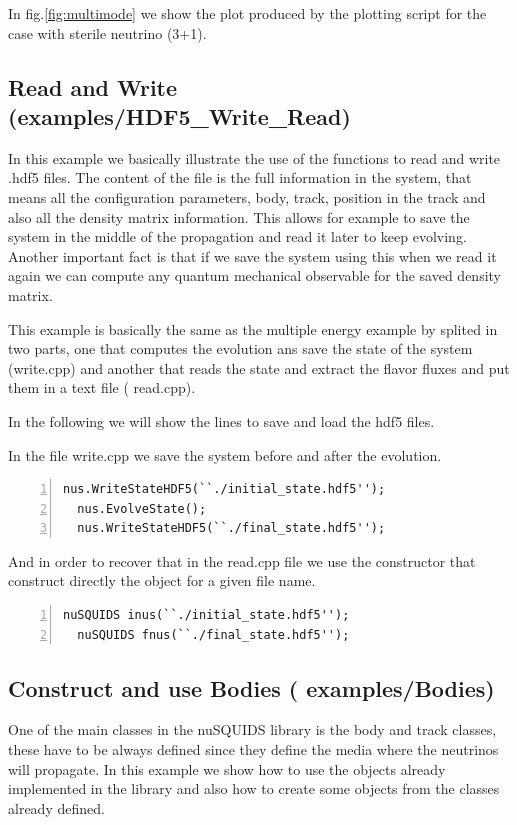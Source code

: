 In fig.\ref{fig:multimode} we show the plot produced by the plotting
script for the case with sterile neutrino (3+1).

\subsection{Read and Write \textnormal{({\ttf examples/HDF5\_Write\_Read})}}

In this example we basically illustrate the use of the functions to
read and write {\ttf .hdf5} files. The content of the file is the full
information in the system, that means all the configuration
parameters, body, track, position in the track and also all the
density matrix information. This allows for example to save the system
in the middle of the propagation and read it later to keep
evolving. Another important fact is that if we save the system using
this when we read it again we can compute any quantum mechanical
observable for the saved density matrix.

This example is basically the same as the multiple energy example by
splited in two parts, one that computes the evolution ans save the
state of the system ({\ttf write.cpp}) and another that reads the
state and extract the flavor fluxes and put them in a text file ({\ttf
  read.cpp}).

In the following we will show the lines to save and load the hdf5
files.

In the file {\ttf write.cpp} we save the system before and after the
evolution.
\begin{lstlisting}[frame=leftline, numbers =
  left,breaklines=true,label = ex:sin1]
  nus.WriteStateHDF5(``./initial_state.hdf5'');
  nus.EvolveState();
  nus.WriteStateHDF5(``./final_state.hdf5'');
\end{lstlisting}

And in order to recover that in the {\ttf read.cpp} file we use the
constructor that construct directly the object for a given file name.

\begin{lstlisting}[frame=leftline, numbers =
  left,breaklines=true,label = ex:sin1]
  nuSQUIDS inus(``./initial_state.hdf5'');
  nuSQUIDS fnus(``./final_state.hdf5''); 
\end{lstlisting}


\subsection{Construct and use Bodies \textnormal{({\ttf
      examples/Bodies})}}
One of the main classes in the nuSQUIDS library is the body and track
classes, these have to be always defined since they define the media
where the neutrinos will propagate. 
In this example we show how to use the objects already implemented in
the library and also how to create some objects from the classes
already defined.

